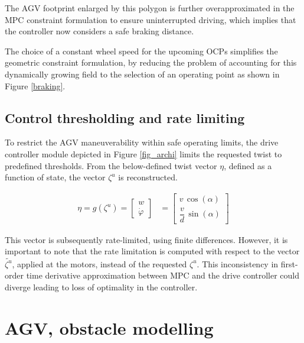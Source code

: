 The \ac{AGV} footprint enlarged by this polygon is further overapproximated in the \ac{MPC} constraint formulation to ensure uninterrupted driving, which implies that the controller now considers a safe braking distance.

\par The choice of a constant wheel speed for the upcoming \ac{OCP}s simplifies the geometric constraint formulation, by reducing the problem of accounting for this dynamically growing field to the selection of an operating point as shown in Figure \ref{braking}. 

\subsection{Control thresholding and rate limiting}\label{safe_thr}
To restrict the \ac{AGV} maneuverability within safe operating limits, the drive controller module depicted in Figure \ref{fig_archi} limits the requested twist to predefined thresholds. From the below-defined twist vector $\eta$, defined as a function of state, the vector $\zeta^{u}$ is reconstructed. 

\begin{align}
    \eta = g(\zeta^{u}) =\begin{bmatrix}
        w\\
        \dot{\varphi}
    \end{bmatrix} &= 
    \begin{bmatrix}
        v\, \cos(\alpha)\\
        \dfrac{v}{d}\, \sin(\alpha)\label{twist}
    \end{bmatrix}
\end{align}

This vector is subsequently rate-limited, using finite differences. However, it is important to note that the rate limitation is computed with respect to the vector $\tilde{\zeta^{u}}$, applied at the motors, instead of the requested $\zeta^{u}$. This inconsistency in first-order time derivative approximation between \ac{MPC} and the drive controller could diverge leading to loss of optimality in the controller.

\section{AGV, obstacle modelling}\label{appr_footprint}

